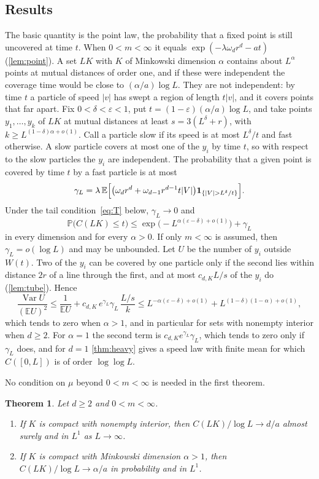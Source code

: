 \documentclass[11pt,a4paper]{article}
\numberwithin{equation}{section}
\newtheorem{theorem}{Theorem}[section]
\theoremstyle{definition}
\theoremstyle{remark}
\newcommand{\E}{\mathbb E}
\newcommand{\Pp}{\mathbb P}
\newcommand{\ind}{\mathbf 1}
\newcommand{\abs}[1]{\lvert#1\rvert}
\begin{document}
\subsection{Results}
The basic quantity is the point law, the probability that a fixed point is
still uncovered at time $t$. When $0<m<\infty$ it equals
$\exp(-\lambda\omega_dr^d-at)$ (\cref{lem:point}). A set $LK$ with $K$ of
Minkowski dimension $\alpha$ contains about $L^\alpha$ points at mutual
distances of order one, and if these were independent the coverage time would
be close to $(\alpha/a)\log L$. They are not independent: by time $t$ a
particle of speed $\abs v$ has swept a region of length $t\abs v$, and it
covers points that far apart. Fix $0<\delta<\varepsilon<1$, put
$t=(1-\varepsilon)(\alpha/a)\log L$, and take points $y_1,\dots,y_k$ of $LK$
at mutual distances at least $s=3(L^\delta+r)$, with
$k\ge L^{(1-\delta)\alpha+o(1)}$. Call a particle slow if its speed is at most
$L^\delta/t$ and fast otherwise. A slow particle covers at most one of the
$y_i$ by time $t$, so with respect to the slow particles the $y_i$ are
independent. The probability that a given point is covered by time $t$ by a
fast particle is at most
\[
\gamma_L=\lambda\,\E\Bigl[\bigl(\omega_dr^d+\omega_{d-1}r^{d-1}t\abs V\bigr)
\ind_{\{\abs V>L^\delta/t\}}\Bigr].
\]
Under the tail condition~\eqref{eq:T} below, $\gamma_L\to0$ and
\[
\Pp\bigl(C(LK)\le t\bigr)\le\exp\bigl(-L^{\alpha(\varepsilon-\delta)+o(1)}\bigr)+\gamma_L
\]
in every dimension and for every $\alpha>0$. If only $m<\infty$ is assumed,
then $\gamma_L=o(\log L)$ and may be unbounded. Let $U$ be the number of $y_i$
outside $W(t)$. Two of the $y_i$ can be covered by one particle only if the
second lies within distance $2r$ of a line through the first, and at most
$c_{d,K}L/s$ of the $y_i$ do (\cref{lem:tube}). Hence
\[
\frac{\operatorname{Var}U}{(\E U)^2}\le\frac1{\E U}
+c_{d,K}\,e^{\gamma_L}\gamma_L\,\frac{L/s}{k}
\le L^{-\alpha(\varepsilon-\delta)+o(1)}+L^{(1-\delta)(1-\alpha)+o(1)},
\]
which tends to zero when $\alpha>1$, and in particular for sets with nonempty
interior when $d\ge2$. For $\alpha=1$ the second term is
$c_{d,K}e^{\gamma_L}\gamma_L$, which tends to zero only if $\gamma_L$ does,
and for $d=1$ \cref{thm:heavy} gives a speed law with finite mean for which
$C([0,L])$ is of order $\log\log L$.

No condition on $\mu$ beyond $0<m<\infty$ is needed in the first theorem.

\begin{theorem}\label{thm:finite-mean}
Let $d\ge2$ and $0<m<\infty$.
\begin{enumerate}[label=(\roman*)]
\item If $K$ is compact with nonempty interior, then
$C(LK)/\log L\to d/a$ almost surely and in $L^1$ as $L\to\infty$.
\item If $K$ is compact with Minkowski dimension $\alpha>1$, then
$C(LK)/\log L\to\alpha/a$ in probability and in $L^1$.
\end{enumerate}
\end{theorem}
\end{document}
